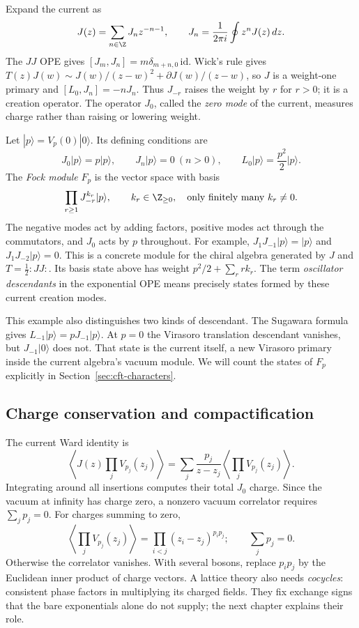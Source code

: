 Expand the current as
\[
 J(z)=\sum_{n\in\Z}J_nz^{-n-1},\qquad
 J_n=\frac{1}{2\pi i}\oint z^nJ(z)\,dz.
\]
The $JJ$ OPE gives $[J_m,J_n]=m\delta_{m+n,0}\,\mathrm{id}$.
Wick's rule gives
$T(z)J(w)\sim J(w)/(z-w)^2+\partial J(w)/(z-w)$,
so $J$ is a weight-one primary and
$[L_0,J_n]=-nJ_n$. Thus $J_{-r}$ raises the weight by $r$ for
$r>0$; it is a creation operator. The operator $J_0$, called the
\emph{zero mode} of the current, measures charge rather than
raising or lowering weight.

Let $|p\rangle=V_p(0)|0\rangle$. Its defining conditions are
\[
 J_0|p\rangle=p|p\rangle,\qquad
 J_n|p\rangle=0\ (n>0),\qquad
 L_0|p\rangle=\frac{p^2}{2}|p\rangle.
\]
The \emph{Fock module} $F_p$ is the vector space with basis
\[
 \prod_{r\ge1}J_{-r}^{k_r}|p\rangle,
 \qquad k_r\in\Z_{\ge0},\quad\text{only finitely many }k_r\ne0.
\]
The negative modes act by adding factors, positive modes act through
the commutators, and $J_0$ acts by $p$ throughout. For example,
$J_1J_{-1}|p\rangle=|p\rangle$ and
$J_1J_{-2}|p\rangle=0$. This is a concrete module for the chiral
algebra generated by $J$ and $T=\tfrac12:JJ:$.
Its basis state above has weight $p^2/2+\sum_r r k_r$.
The term \emph{oscillator descendants} in the exponential OPE means
precisely states formed by these current creation modes.

This example also distinguishes two kinds of descendant. The
Sugawara formula gives
$L_{-1}|p\rangle=pJ_{-1}|p\rangle$. At $p=0$ the Virasoro
translation descendant vanishes, but $J_{-1}|0\rangle$ does not.
That state is the current itself, a new Virasoro primary inside the
current algebra's vacuum module. We will count the states of $F_p$
explicitly in Section~\ref{sec:cft-characters}.

\subsection{Charge conservation and compactification}

The current Ward identity is
\[
 \left\langle J(z)\prod_jV_{p_j}(z_j)\right\rangle
 =\sum_j\frac{p_j}{z-z_j}
             \left\langle\prod_jV_{p_j}(z_j)\right\rangle.
\]
Integrating around all insertions computes their total $J_0$ charge.
Since the vacuum at infinity has charge zero, a nonzero vacuum
correlator requires $\sum_jp_j=0$. For charges summing to zero,
\begin{equation}
 \left\langle\prod_jV_{p_j}(z_j)\right\rangle
 =\prod_{i<j}(z_i-z_j)^{p_ip_j};
 \qquad \sum_jp_j=0.
 \label{eq:cft-gaussian}
\end{equation}
Otherwise the correlator vanishes. With several bosons, replace
$p_ip_j$ by the Euclidean inner product of charge vectors. A lattice
theory also needs \emph{cocycles}: consistent phase factors in
multiplying its charged fields. They fix exchange signs that the
bare exponentials alone do not supply; the next chapter explains
their role.

